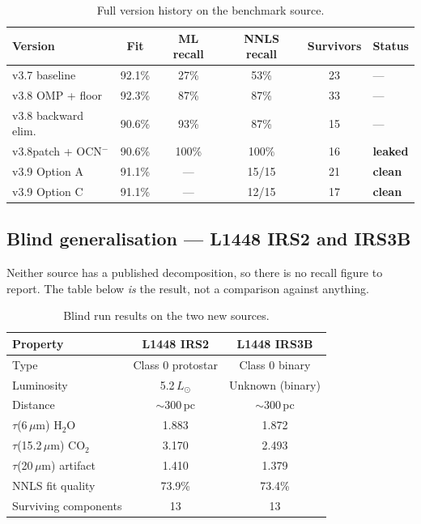 \documentclass[11pt,a4paper]{article}
\newcommand{\um}{\,$\mu$m}
\newcommand{\htwoo}{H$_2$O}
\newcommand{\cotwo}{CO$_2$}
\newcommand{\ocn}{OCN$^-$}
\begin{document}
\begin{table}[H]
\centering
\small
\begin{tabular}{@{}lccccl@{}}
\toprule
\textbf{Version} & \textbf{Fit} & \textbf{ML recall} &
\textbf{NNLS recall} & \textbf{Survivors} & \textbf{Status} \\
\midrule
v3.7 baseline       & 92.1\% & 27\%  & 53\%   & 23 & --- \\
v3.8 OMP + floor    & 92.3\% & 87\%  & 87\%   & 33 & --- \\
v3.8 backward elim. & 90.6\% & 93\%  & 87\%   & 15 & --- \\
v3.8patch + \ocn    & 90.6\% & 100\% & 100\%  & 16 & \textcolor{warnred}{\textbf{leaked}} \\
v3.9 Option A       & 91.1\% & ---   & 15/15  & 21 & \textcolor{goodgreen}{\textbf{clean}} \\
v3.9 Option C       & 91.1\% & ---   & 12/15  & 17 & \textcolor{goodgreen}{\textbf{clean}} \\
\bottomrule
\end{tabular}
\caption{Full version history on the benchmark source.}
\end{table}

\subsection{Blind generalisation --- L1448 IRS2 and IRS3B}

Neither source has a published decomposition, so there is no recall figure
to report. The table below \emph{is} the result, not a comparison against
anything.

\begin{table}[H]
\centering
\small
\begin{tabular}{@{}lcc@{}}
\toprule
\textbf{Property} & \textbf{L1448 IRS2} & \textbf{L1448 IRS3B} \\
\midrule
Type                        & Class 0 protostar & Class 0 binary \\
Luminosity                  & 5.2\,$L_\odot$    & Unknown (binary) \\
Distance                    & $\sim$300\,pc     & $\sim$300\,pc \\
$\tau$(6\um) \htwoo         & 1.883             & 1.872 \\
$\tau$(15.2\um) \cotwo      & 3.170             & 2.493 \\
$\tau$(20\um) artifact      & 1.410             & 1.379 \\
NNLS fit quality            & 73.9\%            & 73.4\% \\
Surviving components        & 13                & 13 \\
\bottomrule
\end{tabular}
\caption{Blind run results on the two new sources.}
\end{table}
\end{document}
